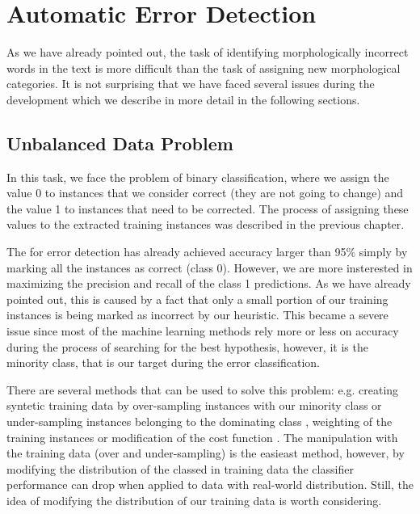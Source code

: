 \section{Automatic Error Detection}


As we have already pointed out, 
the task of identifying morphologically incorrect words in the text is more difficult
than the task of assigning new morphological categories. It is not surprising
that we have faced several issues
during the development which we describe in more detail in the following sections.



\subsection{Unbalanced Data Problem}

In this task, we face the problem of binary classification, where we
assign the value 0 to instances that we consider correct (they are not going to change) and the value 1 to
instances that need to be corrected. The process of assigning these values to the
extracted training instances was described in the previous chapter. 

The  for error detection has already achieved accuracy larger than 95\%
simply by marking all the instances as correct (class 0). However, we are more insterested
in maximizing the precision and recall of the class 1 predictions.
As we have already pointed out, this is caused by a fact that only a small portion of our
training instances is being marked as incorrect by our heuristic.
This became a severe issue since most of the machine learning methods rely more or less on accuracy during
the process of searching for the best hypothesis, however, it is the minority
class, that is our target during the error classification.

There are several methods that can be used to solve this problem: e.g. creating syntetic
training data by over-sampling instances with our minority class or under-sampling instances
belonging to the dominating class \citep{Batista:2004:SBS:1007730.1007735}, weighting of the training instances or modification of the
cost function \citep{Domingos:1999:MGM:312129.312220}. The manipulation with the training data (over and under-sampling) is the easieast method,
however,
by modifying the distribution of the classed in training data the classifier performance
can drop when applied to data with real-world distribution.
Still, the idea of modifying the distribution of our training data is worth considering.

